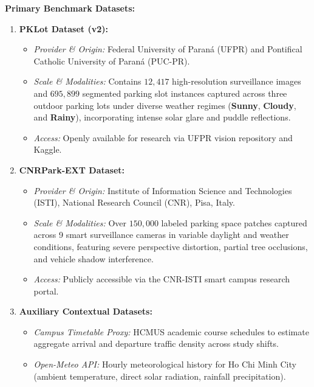 \documentclass[11pt,a4paper]{article}
\begin{document}
\noindent\textbf{Primary Benchmark Datasets:}
\begin{enumerate}[leftmargin=1.5em]
    \item \textbf{PKLot Dataset (v2):}
    \begin{itemize}[leftmargin=1.2em]
        \item \textit{Provider \& Origin:} Federal University of Paraná (UFPR) and Pontifical Catholic University of Paraná (PUC-PR).
        \item \textit{Scale \& Modalities:} Contains $12,417$ high-resolution surveillance images and $695,899$ segmented parking slot instances captured across three outdoor parking lots under diverse weather regimes (\textbf{Sunny}, \textbf{Cloudy}, and \textbf{Rainy}), incorporating intense solar glare and puddle reflections.
        \item \textit{Access:} Openly available for research via UFPR vision repository and Kaggle.
    \end{itemize}

    \item \textbf{CNRPark-EXT Dataset:}
    \begin{itemize}[leftmargin=1.2em]
        \item \textit{Provider \& Origin:} Institute of Information Science and Technologies (ISTI), National Research Council (CNR), Pisa, Italy.
        \item \textit{Scale \& Modalities:} Over $150,000$ labeled parking space patches captured across 9 smart surveillance cameras in variable daylight and weather conditions, featuring severe perspective distortion, partial tree occlusions, and vehicle shadow interference.
        \item \textit{Access:} Publicly accessible via the CNR-ISTI smart campus research portal.
    \end{itemize}

    \item \textbf{Auxiliary Contextual Datasets:}
    \begin{itemize}[leftmargin=1.2em]
        \item \textit{Campus Timetable Proxy:} HCMUS academic course schedules to estimate aggregate arrival and departure traffic density across study shifts.
        \item \textit{Open-Meteo API:} Hourly meteorological history for Ho Chi Minh City (ambient temperature, direct solar radiation, rainfall precipitation).
    \end{itemize}
\end{enumerate}
\end{document}
